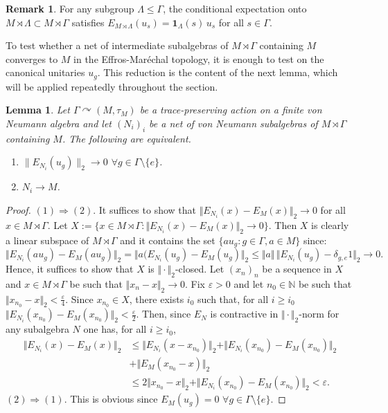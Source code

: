 \documentclass[12pt]{amsart} %
\theoremstyle{plain}
\newtheorem{lemma}[theorem]{Lemma}
\theoremstyle{definition}
\newtheorem{remark}[theorem]{Remark}
\newcommand{\N}{\mathbb{N}}
\begin{document}
\begin{remark}\label{RmkEMrtimesLambda}
For any subgroup $\Lambda\leq\Gamma$, the conditional expectation onto $M\rtimes\Lambda\subset M\rtimes\Gamma$ satisfies $E_{M\rtimes\Lambda}(u_s)=\mathbf{1}_\Lambda(s)\,u_s$ for all $s\in\Gamma$.
\end{remark}
To test whether a net of intermediate subalgebras of $M\rtimes\Gamma$ containing $M$ converges to $M$ in the Effros-Mar\'echal topology, it is enough to test on the canonical unitaries $u_g$. This reduction is the content of the next lemma, which will be applied repeatedly throughout the section.
\begin{lemma}\label{LemExpectationConvergenceFromBoundary}
Let $\Gamma \curvearrowright (M,\tau_M)$ be a trace-preserving action on a finite
von Neumann algebra and let $(N_i)_i$ be a net of von Neumann subalgebras of $M\rtimes\Gamma$ containing $M$. The following are equivalent.
\begin{enumerate}
\item $\|E_{N_i}(u_g)\|_2\longrightarrow 0$ $\forall g\in \Gamma\setminus\{e\}$.
\item $N_i\rightarrow M$.
\end{enumerate}
\end{lemma}
\begin{proof}
$(1)\Rightarrow(2)$. It suffices to show that $\Vert E_{N_i}(x)-E_M(x)\Vert_2\rightarrow 0$ for all $x\in M\rtimes\Gamma$. Let $X:=\{x\in M\rtimes\Gamma:\Vert E_{N_i}(x)-E_M(x)\Vert_2\rightarrow 0\}$. Then $X$ is clearly a linear subspace of $M\rtimes\Gamma$ and it contains the set $\{au_g:g\in\Gamma,a\in M\}$ since:
$$\Vert E_{N_i}(au_g)-E_M(au_g)\Vert_2=\Vert a(E_{N_i}(u_g)-E_M(u_g)\Vert_2\leq\Vert a\Vert\,\Vert E_{N_i}(u_g)-\delta_{g,e}1\Vert_2\rightarrow 0.$$
Hence, it suffices to show that $X$ is $\Vert\cdot\Vert_2$-closed. Let $(x_n)_n$ be a sequence in $X$ and $x\in M\rtimes\Gamma$ be such that $\Vert x_n-x\Vert_2\rightarrow 0$. Fix $\varepsilon>0$ and let $n_0\in\N$ be such that $\Vert x_{n_0}-x\Vert_2<\frac{\varepsilon}{4}$. Since $x_{n_0}\in X$, there exists $i_0$ such that, for all $i\geq i_0$ $\Vert E_{N_i}(x_{n_0})-E_M(x_{n_0})\Vert_2<\frac{\varepsilon}{2}$. Then, since $E_N$ is contractive in $\Vert\cdot\Vert_2$-norm for any subalgebra $N$ one has, for all $i\geq i_0$,
\begin{align*}
 \Vert E_{N_i}(x)-E_M(x)\Vert_2&\leq \Vert E_{N_i}(x-x_{n_0})\Vert_2+\Vert E_{N_i}(x_{n_0})-E_M(x_{n_0})\Vert_2\\&+\Vert E_M(x_{n_0}-x)\Vert_2
 \\&\leq 2\Vert x_{n_0}-x\Vert_2+\Vert E_{N_i}(x_{n_0})-E_M(x_{n_0})\Vert_2<\varepsilon.
 \end{align*}
\medskip
\noindent $(2)\Rightarrow(1)$. This is obvious since $E_M(u_g)=0$ $\forall g\in \Gamma\setminus\{e\}$.
\end{proof}
\end{document}
